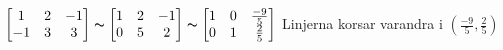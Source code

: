 $\begin{bmatrix}
1 &2 &-1 \\
-1 &3 & 3
\end{bmatrix}\thicksim
\begin{bmatrix}
1 & 2&-1 \\
0 &5 &2 
\end{bmatrix}\thicksim
\begin{bmatrix}
1 &0 &\frac{-9}{5} \\
0 &1 &\frac{2}{5} 
\end{bmatrix}
$ Linjerna korsar varandra i $(\frac{-9}{5},\frac{2}{5})$
